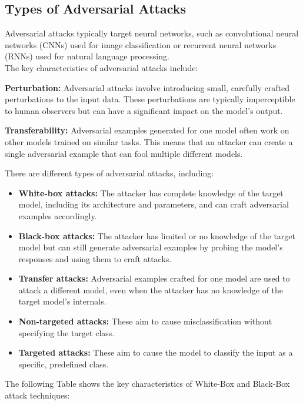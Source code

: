 \subsection{Types of Adversarial Attacks}
Adversarial attacks typically target neural networks, such as convolutional neural networks (CNNs) used for image classification or recurrent neural networks (RNNs) used for natural language processing. \\[1cm]
The key characteristics of adversarial attacks include:

\textbf{Perturbation:} Adversarial attacks involve introducing small, carefully crafted perturbations to the input data. These perturbations are typically imperceptible to human observers but can have a significant impact on the model's output.

\textbf{Transferability:} Adversarial examples generated for one model often work on other models trained on similar tasks. This means that an attacker can create a single adversarial example that can fool multiple different models.

There are different types of adversarial attacks, including:
\begin{itemize}
    \item \textbf{White-box attacks:} The attacker has complete knowledge of the target model, including its architecture and parameters, and can craft adversarial examples accordingly.

    \item \textbf{Black-box attacks:} The attacker has limited or no knowledge of the target model but can still generate adversarial examples by probing the model's responses and using them to craft attacks.

    \item \textbf{Transfer attacks:} Adversarial examples crafted for one model are used to attack a different model, even when the attacker has no knowledge of the target model's internals.

    \item \textbf{Non-targeted attacks:} These aim to cause misclassification without specifying the target class.

    \item \textbf{Targeted attacks:} These aim to cause the model to classify the input as a specific, predefined class.

\end{itemize}
 The following Table shows the key characteristics of White-Box and Black-Box attack techniques:


